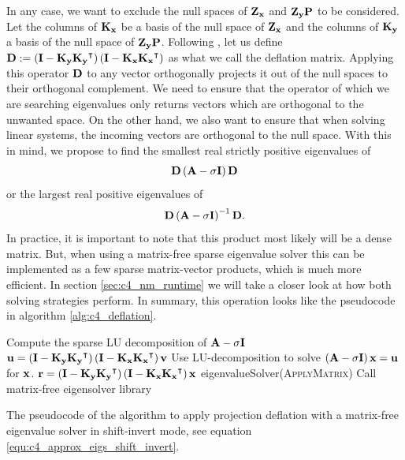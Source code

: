 In any case, we want to exclude the null spaces of $\vb{Z_x}$ and $\vb{Z_y} \vb{P}$ to be considered. Let the columns of $\vb{K_x}$ be a basis of the null space of $\vb{Z_x}$ and the columns of $\vb{K_y}$ a basis of the null space of $\vb{Z_y}\vb{P}$. Following \cite{saad_numerical_2011,mackey_deflation_2008}, let us define $\vb{D} := \left(\vb{I} - \vb{K_y} \vb{K_y}^\intercal\right) \left(\vb{I} - \vb{K_x} \vb{K_x}^\intercal\right)$ as what we call the deflation matrix. Applying this operator $\vb{D}$ to any vector orthogonally projects it out of the null spaces to their orthogonal complement. We need to ensure that the operator of which we are searching eigenvalues only returns vectors which are orthogonal to the unwanted space. On the other hand, we also want to ensure that when solving linear systems, the incoming vectors are orthogonal to the null space. With this in mind, we propose to find the smallest real strictly positive eigenvalues of
$$
    \vb{D} \left(\vb{A} - \sigma \vb{I}\right) \vb{D}
$$
or the largest real positive eigenvalues of
\begin{equation}\label{equ:c4_approx_eigs_shift_invert}
    \vb{D} \left(\vb{A} - \sigma \vb{I}\right)^{-1} \vb{D}\text{.}
\end{equation}
In practice, it is important to note that this product most likely will be a dense matrix. But, when using a matrix-free sparse eigenvalue solver this can be implemented as a few sparse matrix-vector products, which is much more efficient. In section \ref{sec:c4_nm_runtime} we will take a closer look at how both solving strategies perform. In summary, this operation looks like the pseudocode in algorithm \ref{alg:c4_deflation}.

\begin{algorithm}
    \begin{algorithmic}
        \State Compute the sparse LU decomposition of $\vb{A} - \sigma \vb{I}$
        \State
        \State $\vb{u} = \left(\vb{I} - \vb{K_y} \vb{K_y}^\intercal\right) \left(\vb{I} - \vb{K_x} \vb{K_x}^\intercal\right) \vb{v}$
        \State Use LU-decomposition to solve $\left(\vb{A} - \sigma \vb{I}\right) \vb{x} = \vb{u}$ for $\vb{x}$.
        \State $\vb{r} = \left(\vb{I} - \vb{K_y} \vb{K_y}^\intercal\right) \left(\vb{I} - \vb{K_x} \vb{K_x}^\intercal\right) \vb{x}$
        \EndFunction
        \State
        \State eigenvalueSolver(\textsc{ApplyMatrix}) \Comment Call matrix-free eigensolver library
    \end{algorithmic}
    \caption{The pseudocode of the algorithm to apply projection deflation with a matrix-free eigenvalue solver in shift-invert mode, see equation \eqref{equ:c4_approx_eigs_shift_invert}.}\label{alg:c4_deflation}
\end{algorithm}

